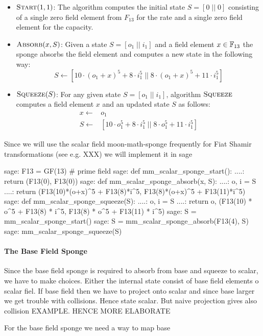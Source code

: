 \begin{itemize}
\item $\textsc{Start}(1,1)$: The algorithm computes the initial state $S=[0\;||\;0]$  consisting of a single zero field element from $F_{13}$ for the rate and a single zero field element for the capacity.
\item $\textsc{Absorb}(x,S)$: Given a state $S=[o_1\;||\;i_1]$ and a field element $x\in \mathbb{F}_{13}$ the sponge absorbs the field element and computes a new state in the following way:
$$
S \leftarrow [10\cdot (o_1+x)^5 + 8\cdot i_1^5 \;||\; 8\cdot (o_1+x)^5 + 11\cdot i_1^5]
$$
\item $\textsc{Squeeze}(S)$: For any given state $S=[o_1\;||\;i_1]$, algorithm $\textsc{Squeeze}$ computes a field element $x$ and an updated state $S$ as follows:
\begin{align*}
x \leftarrow & o_1 \\
S \leftarrow & [10\cdot o_1^5 + 8\cdot i_1^5 \;||\; 8\cdot o_1^5 + 11\cdot i_1^5]
\end{align*} 
\end{itemize}
Since we will use the scalar field moon-math-sponge frequently for Fiat Shamir transformations (see e.g. XXX) we will implement it in sage
\begin{sagecommandline}
sage: F13 = GF(13) # prime field
sage: def mm_scalar_sponge_start():
....:     return (F13(0), F13(0))
sage: def mm_scalar_sponge_absorb(x, S):
....:     o, i = S
....:     return (F13(10)*(o+x)^5 + F13(8)*i^5, F13(8)*(o+x)^5 + F13(11)*i^5)
sage: def mm_scalar_sponge_squeeze(S):
....:     o, i = S
....:     return o, (F13(10) * o^5 + F13(8) * i^5, F13(8) * o^5 + F13(11) * i^5)
sage: S = mm_scalar_sponge_start()
sage: S = mm_scalar_sponge_absorb(F13(4), S)
sage: mm_scalar_sponge_squeeze(S)
\end{sagecommandline}

\paragraph{The Base Field Sponge}
Since the base field sponge is required to absorb from base and squeeze to scalar, we have to make choices. Either the internal state consist of base field elements o scalar fiel. If base field then we have to project onto scalar and since base larger we get trouble with collisions. Hence state scalar. But naive projection gives also collision EXAMPLE. HENCE MORE ELABORATE


 
For the base field sponge we need a way to map base

